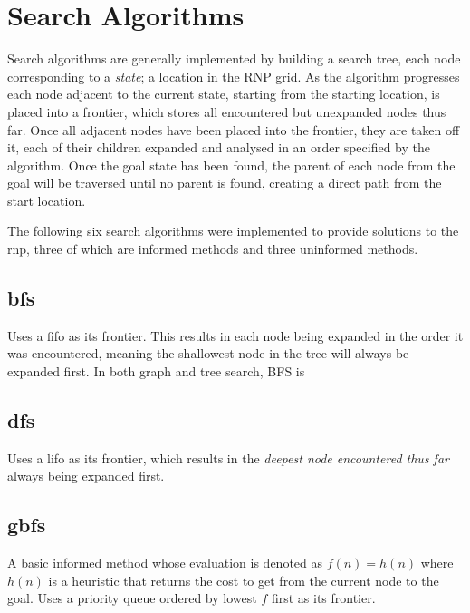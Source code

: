 \section{Search Algorithms} %
\label{sec:search_algorithms}
Search algorithms are generally implemented by building a search \gls{tree}, each node corresponding to a \textit{state}; a location in the RNP grid. As the algorithm progresses each node adjacent to the current state, starting from the starting location, is placed into a \Gls{frontier}, which stores all encountered but unexpanded nodes thus far. Once all adjacent nodes have been placed into the frontier, they are taken off it, each of their children expanded and analysed in an order specified by the algorithm. Once the goal state has been found, the parent of each node from the goal will be traversed until no parent is found, creating a direct path from the start location.
\par
The following six search algorithms were implemented to provide solutions to the \gls{rnp}, three of which are \gls{informed} methods and three \gls{uninformed} methods.

\subsection{\texorpdfstring{\acrfull{bfs}}{BFS}} %
\label{sub:bfs}
Uses a \acrfull{fifo} as its frontier. This results in each node being expanded in the order it was encountered, meaning the shallowest node in the tree will always be expanded first. In both graph and tree search, BFS is 

\subsection{\texorpdfstring{\acrfull{dfs}}{DFS}} %
\label{sub:dfs}
Uses a \acrfull{lifo} as its frontier, which results in the \textit{deepest node encountered thus far} always being expanded first.

\subsection{\texorpdfstring{\acrfull{gbfs}}{GBFS}} %
\label{sub:gbfs}
A basic \gls{informed} method whose \gls{evaluation} is denoted as $f(n)=h(n)$ where $h(n)$ is a \gls{heuristic} that returns the cost to get from the current node to the goal. Uses a priority queue ordered by lowest $f$ first as its frontier.


